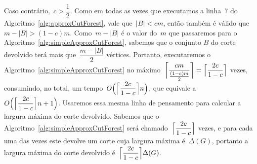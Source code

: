 	Caso contrário,~${c>\dfrac{1}{2}}$. Como em todas as vezes que
	executamos a linha~7 do Algoritmo~\ref{alg:approxCutForest}, 
	vale que~${|B|<cm}$, então também é válido que~${m-|B|>(1-c)m}$.
	Como~${m-|B|}$ é o valor do~$m$ que passaremos para o 
	Algoritmo~\ref{alg:simpleApproxCutForest}, sabemos que o 
	conjunto $B$ do corte devolvido terá mais 
	que~$\dfrac{m-|B|}{2}$ vértices.
	Portanto, executaremos o 
	Algoritmo~\ref{alg:simpleApproxCutForest} no 
	máximo~${\ceil[\bigg]{\dfrac{cm}{\frac{(1-c)m}{2}}} 
	=\ceil[\Big]{\dfrac{2c}{1-c}}}$ vezes, consumindo, no total, um
	tempo~$O\Big(\ceil[\Big]{ \dfrac{2c}{1-c}} n\Big)$,
	que equivale a~$O\Big(\ceil[\Big]{ \dfrac{2c}{1-c}} n+1\Big)$.
	Usaremos essa mesma linha de pensamento para calcular a largura
	máxima do corte devolvido. Sabemos que o 
	Algoritmo~\ref{alg:simpleApproxCutForest} será 
	chamado~$\ceil[\Big]{\dfrac{2c}{1-c}}$ vezes, e para cada uma 
	das vezes este devolve um corte cuja largura 
	máxima é~$\Delta(G)$, portanto a largura máxima do corte 
	devolvido é~$\ceil[\Big]{\dfrac{2c}{1-c}}\Delta(G)$.